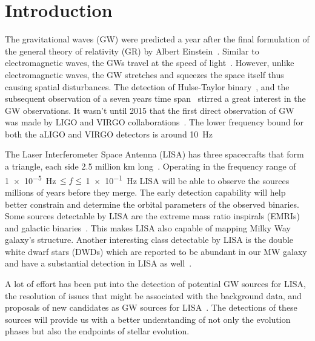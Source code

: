 \documentclass[twocolumn, twocolappendix]{aastex63}
\begin{document}
\section{Introduction} \label{sec:intro}
The gravitational waves (GW) were predicted a year after the final formulation of the general theory of relativity (GR) by Albert Einstein~\citep{Einstein1916}.
Similar to electromagnetic waves, the GWs travel at the speed of light~\citep{Eddington1922, Abott2016}.
However, unlike electromagnetic waves, the GW stretches and squeezes the space itself thus causing spatial disturbances.
The detection of Hulse-Taylor binary~\citep{Hulse1975}, and the subsequent observation of a seven years time span~\citep{Taylor1982} stirred a great interest in the GW observations.
It wasn't until 2015 that the first direct observation of GW was made by LIGO and VIRGO collaborations~\citep{Abott2016}.
The lower frequency bound for both the aLIGO and VIRGO detectors is around \SI{10}{\hertz}~\citep{aLIGO2015, aVIRGO2014}

The Laser Interferometer Space Antenna (LISA) has three spacecrafts that form a triangle, each side 2.5 million km long~\citep{Prince2002, Robson2019}.
Operating in the frequency range of \SI{1e-5}{\hertz}$\,\leq  f \leq\,$\SI{1e-1}{\hertz} LISA will be able to observe the sources millions of years before they merge.
The early detection capability will help better constrain and determine the orbital parameters of the observed binaries.
Some sources detectable by LISA are the extreme mass ratio inspirals (EMRIs)~\citep{Klein2016, Gair2017, Chapman2022} and galactic binaries~\citep{Abott2016, Wagg2021, Digman2022}.
This makes LISA also capable of mapping Milky Way galaxy's structure.
Another interesting class detectable by LISA is the double white dwarf stars (DWDs) which are reported to be abundant in our MW galaxy and have a substantial detection in LISA as well~\citep{Nelemans2001, Willems2007, Ruiter2010, Korol2017}.

A lot of effort has been put into the detection of potential GW sources for LISA, the resolution of issues that might be associated with the background data, and proposals of new candidates as GW sources for LISA~\citep[see, for example,][]{Nelemans2001, Babak2008, Sesana2009, Babak2010, Belczynski2010, Blaut2010, Ruiter2010, Yu2010, Guo2017, Khakhaleva2020, Lau2020, Broekgaarden2021, Shao2021, Renzo2021, Andrews2020, Fumagalli2022, Wagg2021}.
The detections of these sources will provide us with a better understanding of not only the evolution phases but also the endpoints of stellar evolution.
\end{document}
